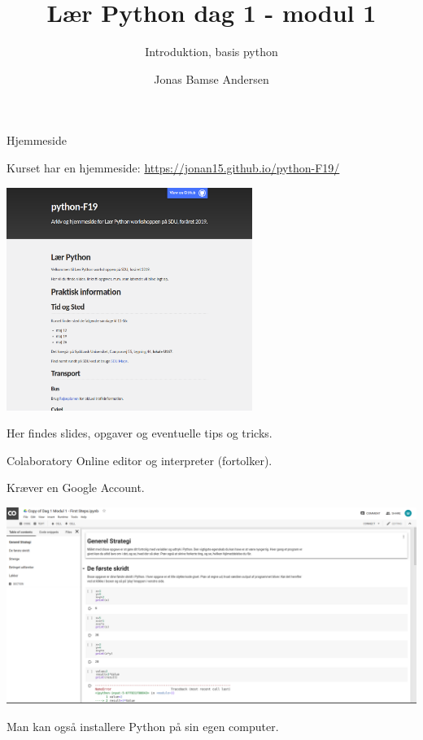 \documentclass{beamer}
\title{Lær Python dag 1 - modul 1}
\subtitle{Introduktion, basis python}
\date{}
\author{Jonas Bamse Andersen}
\institute{Syddansk Universitet}
\begin{document}
	
	\maketitle

\begin{frame}{Hjemmeside}

Kurset har en hjemmeside: \url{https://jonan15.github.io/python-F19/}
\begin{center}
\includegraphics[trim={0 5cm 0 0}, clip, width=0.6\textwidth]{webpage.png}
\end{center}

Her findes slides, opgaver og eventuelle tips og tricks.	
\end{frame}


\begin{frame}{Colaboratory}
Online editor og interpreter (fortolker).

Kræver en Google Account.

\begin{center}
	\includegraphics[width=\textwidth]{colaboratory.png}
\end{center}

Man kan også installere Python på sin egen computer.
\end{frame}
\end{document}
